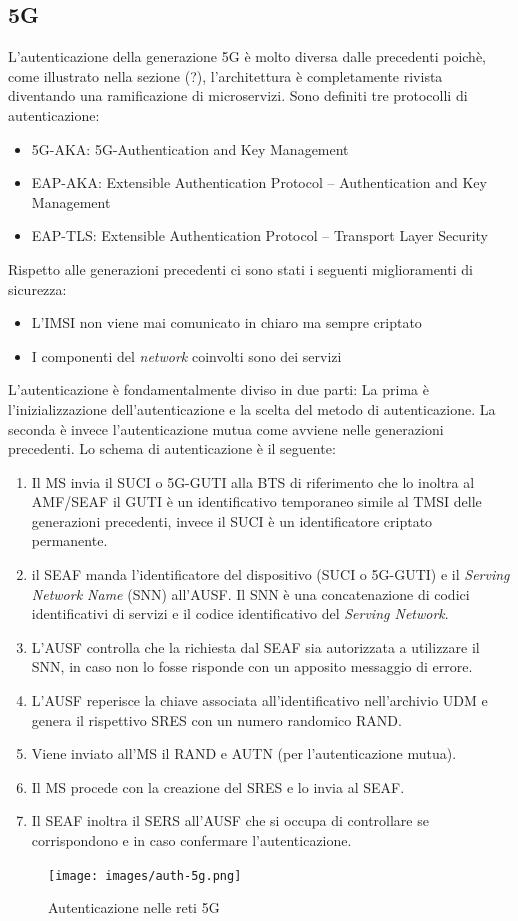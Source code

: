 \clearpage

\subsection{5G}
L'autenticazione della generazione 5G è molto diversa dalle precedenti poichè, come illustrato nella sezione (?), l'architettura è completamente rivista diventando una ramificazione di microservizi.
Sono definiti tre protocolli di autenticazione:
\begin{itemize}
    \item 5G-AKA: 5G-Authentication and Key Management
    \item EAP-AKA: Extensible Authentication Protocol – Authentication and Key Management
    \item EAP-TLS: Extensible Authentication Protocol – Transport Layer Security
\end{itemize}
Rispetto alle generazioni precedenti ci sono stati i seguenti miglioramenti di sicurezza:
\begin{itemize}
    \item L'IMSI non viene mai comunicato in chiaro ma sempre criptato
    \item I componenti del \textit{network} coinvolti sono dei servizi
\end{itemize}
L'autenticazione è fondamentalmente diviso in due parti: La prima è l'inizializzazione dell'autenticazione e la scelta del metodo di autenticazione.
La seconda è invece l'autenticazione mutua come avviene nelle generazioni precedenti.
Lo schema di autenticazione è il seguente:
\begin{enumerate}
    \item Il MS invia il SUCI o 5G-GUTI alla BTS di riferimento che lo inoltra al AMF/SEAF
    il GUTI è un identificativo temporaneo simile al TMSI delle generazioni precedenti, invece il SUCI è un identificatore criptato
    permanente.
    \item il SEAF manda l'identificatore del dispositivo (SUCI o 5G-GUTI) e il \textit{Serving Network Name} (SNN) all'AUSF.
    Il SNN è una concatenazione di codici identificativi di servizi e il codice identificativo del \textit{Serving Network}.
    \item L'AUSF controlla che la richiesta dal SEAF sia autorizzata a utilizzare il SNN, in caso non lo fosse risponde con un 
    apposito messaggio di errore.
    \item L'AUSF reperisce la chiave associata all'identificativo nell'archivio UDM e genera il rispettivo SRES con un numero randomico RAND.
    \item Viene inviato all'MS il RAND e AUTN (per l'autenticazione mutua).
    \item Il MS procede con la creazione del SRES e lo invia al SEAF.
    \item Il SEAF inoltra il SERS all'AUSF che si occupa di controllare se corrispondono e in caso confermare l'autenticazione.
\end{enumerate}
\begin{figure}[h]
    \centering
    \texttt{[image: images/auth-5g.png]}
    \caption{Autenticazione nelle reti 5G}
\end{figure}